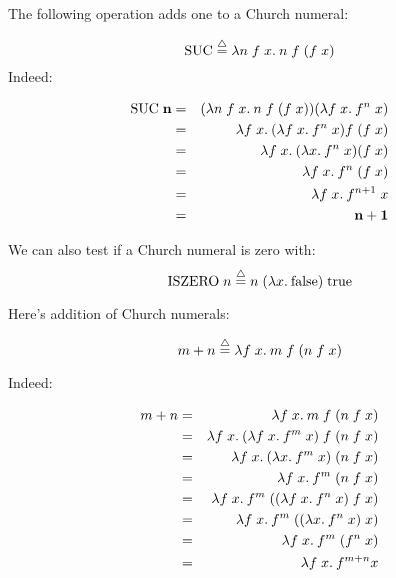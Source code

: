 \begin{slide*}


\vspace*{0.5cm}

The following operation adds one to a Church numeral:

{\red $$ \mbox{SUC} \stackrel{\bigtriangleup}{=} \lambda n\; f\; x.\: n\; f\; (f\; x) $$}
Indeed:

\begin{red}
\begin{eqnarray*}
\mbox{SUC}\; {\bf n} & = &
(\lambda n\; f\; x.\: n\; f\; (f\; x)) (\lambda f\; x.\: f^n\; x) \\
             & = & \lambda f\; x.\: (\lambda f\; x.\: f^n\; x) f\; (f\; x)          \\
             & = & \lambda f\; x.\: (\lambda x.\: f^n\; x) (f\; x)                \\
             & = & \lambda f\; x.\: f^n\; (f\; x)                                \\
             & = & \lambda f\; x.\: f^{n + 1}\; x                               \\
             & = & {\bf n + 1}
\end{eqnarray*}
\end{red}
We can also test if a Church numeral is zero with:
{\red $$ \mbox{ISZERO}\; n \stackrel{\bigtriangleup}{=} n\; (\lambda x.\: \mbox{false})\; \mbox{true} $$}


\end{slide*}



\begin{slide*}


\vspace*{0.5cm}

Here's addition of Church numerals:

{\red $$m + n \stackrel{\bigtriangleup}{=} \lambda f\; x.\: m\; f\; (n\; f\; x) $$}

Indeed:

\begin{red}
\begin{eqnarray*}
 m + n  & = & \lambda f\; x.\: m\; f\; (n\; f\; x)        \\
        & = & \lambda f\; x.\: (\lambda f\; x.\: f^m\; x)\; f\; (n\; f\; x)     \\
        & = & \lambda f\; x.\: (\lambda x.\: f^m\; x)\; (n\; f\; x)     \\
        & = & \lambda f\; x.\: f^m\; (n\; f\; x)                    \\
        & = & \lambda f\; x.\: f^m\; ((\lambda f\; x.\: f^n\; x)\; f\; x)   \\
        & = & \lambda f\; x.\: f^m\; ((\lambda x.\: f^n\; x)\; x)               \\
        & = & \lambda f\; x.\: f^m\; (f^n\; x)                              \\
        & = & \lambda f\; x.\: f^{m + n} x
\end{eqnarray*}
\end{red}

\end{slide*}


